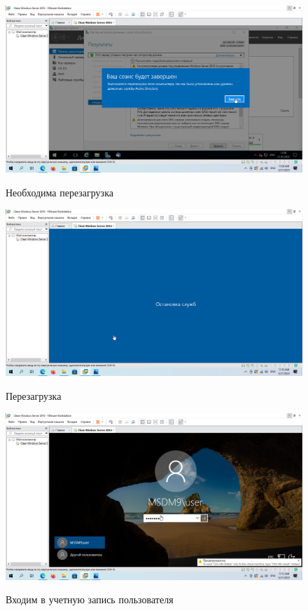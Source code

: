 \documentclass[a4paper]{article}
\begin{document}
  \begin{figure}[H]
    \centering
    \includegraphics[width=\textwidth]{11_0043}
    \label{img:43}
    \caption{Необходима перезагрузка}
  \end{figure}

  \begin{figure}[H]
    \centering
    \includegraphics[width=\textwidth]{11_0044}
    \label{img:44}
    \caption{Перезагрузка}
  \end{figure}

  \begin{figure}[H]
    \centering
    \includegraphics[width=\textwidth]{11_0045}
    \label{img:45}
    \caption{Входим в учетную запись пользователя}
  \end{figure}
\end{document}
